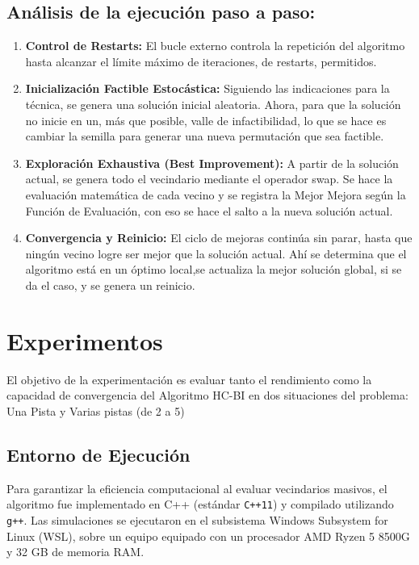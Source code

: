 \documentclass[letter, 10pt]{article}
\begin{document}
\subsection{Análisis de la ejecución paso a paso:}
\begin{enumerate}
    \item \textbf{Control de Restarts:} El bucle externo controla la repetición del algoritmo hasta alcanzar el límite máximo de iteraciones, de restarts, permitidos.
    \item \textbf{Inicialización Factible Estocástica:} Siguiendo las indicaciones para la técnica, se genera una solución inicial aleatoria. Ahora, para que la solución no inicie en un, más que posible, valle de infactibilidad, lo que se hace es cambiar la semilla para generar una nueva permutación que sea factible.
    \item \textbf{Exploración Exhaustiva (Best Improvement):} A partir de la solución actual, se genera todo el vecindario mediante el operador swap. Se hace la evaluación matemática de cada vecino y se registra la Mejor Mejora según la Función de Evaluación, con eso se hace el salto a la nueva solución actual.
    \item \textbf{Convergencia y Reinicio:} El ciclo de mejoras continúa sin parar, hasta que ningún vecino logre ser mejor que la solución actual. Ahí se determina que el algoritmo está en un óptimo local,se actualiza la mejor solución global, si se da el caso, y se genera un reinicio.
\end{enumerate}

\section{Experimentos}
El objetivo de la experimentación es evaluar tanto el rendimiento como la capacidad de convergencia del Algoritmo HC-BI en dos situaciones del problema: Una Pista y Varias pistas (de 2 a 5)

\subsection{Entorno de Ejecución}
Para garantizar la eficiencia computacional al evaluar vecindarios masivos, el algoritmo fue implementado en C++ (estándar \texttt{C++11}) y compilado utilizando \texttt{g++}. Las simulaciones se ejecutaron en el subsistema Windows Subsystem for Linux (WSL), sobre un equipo equipado con un procesador AMD Ryzen 5 8500G y 32 GB de memoria RAM.
\end{document}

